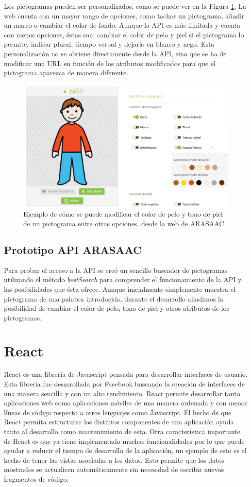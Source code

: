 Los pictogramas pueden ser personalizados, como se puede ver en la Figura \ref{fig:colorespicto}. La web cuenta con un mayor rango de opciones, como tachar un pictograma, añadir un marco o cambiar el color de fondo. Aunque la API es más limitada y cuenta con menos opciones, éstas son: cambiar el color de pelo y piel si el pictograma  lo permite, indicar plural, tiempo verbal y dejarlo en blanco y nego. Esta personalización no se obtiene directamente desde la API, sino que se ha de modificar una URL en función de los atributos modificados para que el pictograma aparezca de manera diferente. 

\begin{figure}[h!]
	\centering
	\includegraphics[width=0.7\linewidth]{Imagenes/Bitmap/coloresPicto}
	\caption{Ejemplo de cómo se puede modificar el color de pelo y tono de piel de un pictograma entre otras opciones, desde la web de ARASAAC.}
	\label{fig:colorespicto}
\end{figure}
\subsection{Prototipo API ARASAAC}
Para probar el acceso a la API se creó un sencillo buscador de pictogramas utilizando el método \textit{bestSearch} para comprender el funcionamiento de la API y las posibilidades que ésta ofrece. Aunque inicialmente simplemente muestra el pictograma de una palabra introducida, durante el desarrollo añadimos la posibilidad de cambiar el color de pelo, tono de piel y otros atributos de los pictogramas.

\section{React}

React es una librería de Javascript pensada para desarrollar interfaces de usuario. Esta librería fue desarrollada por Facebook buscando la creación de interfaces de una manera sencilla y con un alto rendimiento. 
React permite desarrollar tanto aplicaciones web como aplicaciones móviles de una manera ordenada y con menos líneas de código respecto a otros lenguajes como Javascript. El hecho de que React permita estructurar los distintos componentes de una aplicación ayuda tanto al desarrollo como mantenimiento de esta.
Otra característica importante de React es que ya tiene implementado muchas funcionalidades por lo que puede ayudar a reducir el tiempo de desarrollo de la aplicación, un ejemplo de esto es el hecho de tener las vistas asociadas a los datos. Esto permite que los datos mostrados se actualicen automáticamente sin necesidad de escribir nuevos fragmentos de código.


